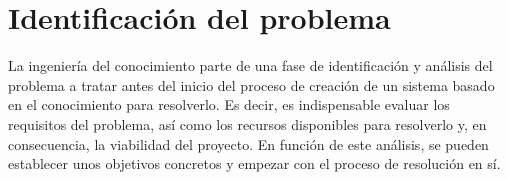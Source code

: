 
\section{Identificación del problema} \label{sec:identificacion}

La ingeniería del conocimiento parte de una fase de identificación y análisis 
del problema a tratar antes del inicio del proceso de creación de un sistema 
basado en el conocimiento para resolverlo. Es decir, es indispensable evaluar 
los requisitos del problema, así como los recursos disponibles para resolverlo 
y, en consecuencia, la viabilidad del proyecto. En función de este análisis, 
se pueden establecer unos objetivos concretos y empezar con el proceso de 
resolución en sí.









\clearpage

